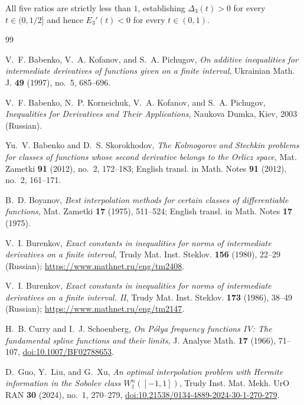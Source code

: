 \documentclass[11pt,a4paper]{article}
\theoremstyle{remark}
\numberwithin{equation}{section}
\begin{document}
All five ratios are strictly less than $1$, establishing $\Delta_3(t) > 0$ for every $t \in (0, 1/2]$ and hence $E_3'(t) < 0$ for every $t \in (0, 1)$.

\begin{thebibliography}{99}

V.~F. Babenko, V.~A. Kofanov, and S.~A. Pichugov,
\emph{On additive inequalities for intermediate derivatives of functions given on a finite interval},
Ukrainian Math. J. \textbf{49} (1997), no.~5, 685--696.

V.~F. Babenko, N.~P. Korneichuk, V.~A. Kofanov, and S.~A. Pichugov,
\emph{Inequalities for Derivatives and Their Applications},
Naukova Dumka, Kiev, 2003 (Russian).

Yu.~V. Babenko and D.~S. Skorokhodov,
\emph{The Kolmogorov and Stechkin problems for classes of functions whose second derivative belongs to the Orlicz space},
Mat. Zametki \textbf{91} (2012), no.~2, 172--183; English transl. in Math. Notes \textbf{91} (2012), no.~2, 161--171.

B.~D. Boyanov,
\emph{Best interpolation methods for certain classes of differentiable functions},
Mat. Zametki \textbf{17} (1975), 511--524; English transl. in Math. Notes \textbf{17} (1975).

V.~I. Burenkov,
\emph{Exact constants in inequalities for norms of intermediate derivatives on a finite interval},
Trudy Mat. Inst. Steklov. \textbf{156} (1980), 22--29 (Russian); \url{https://www.mathnet.ru/eng/tm2408}.

V.~I. Burenkov,
\emph{Exact constants in inequalities for norms of intermediate derivatives on a finite interval. II},
Trudy Mat. Inst. Steklov. \textbf{173} (1986), 38--49 (Russian); \url{https://www.mathnet.ru/eng/tm2147}.

H.~B. Curry and I.~J. Schoenberg,
\emph{On P\'olya frequency functions IV: The fundamental spline functions and their limits},
J. Analyse Math. \textbf{17} (1966), 71--107, \href{https://doi.org/10.1007/BF02788653}{doi:10.1007/BF02788653}.

D.~Guo, Y.~Liu, and G.~Xu,
\emph{An optimal interpolation problem with Hermite information in the Sobolev class $W_1^n([-1,1])$},
Trudy Inst. Mat. Mekh. UrO RAN \textbf{30} (2024), no.~1, 270--279, \href{https://doi.org/10.21538/0134-4889-2024-30-1-270-279}{doi:10.21538/0134-4889-2024-30-1-270-279}.


\end{thebibliography}
\end{document}
